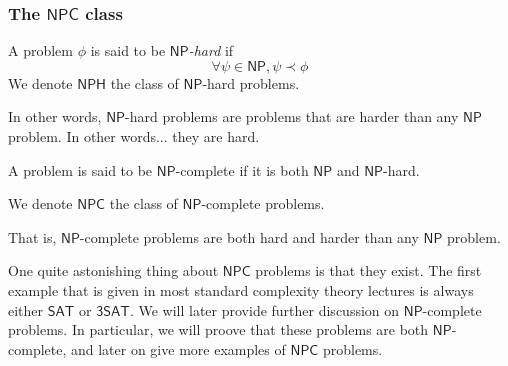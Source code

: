 \subsubsection{The $ \mathsf{NPC} $ class}

\begin{definition}
    A problem $ \phi $ is said to be \textit{$ \mathsf{NP} $-hard} if
    \[
        \forall \psi \in \mathsf{NP}, \psi \prec \phi
    \]
    We denote $ \mathsf{NPH} $ the class of $ \mathsf{NP} $-hard problems.
\end{definition}

In other words, $ \mathsf{NP} $-hard problems are problems that are harder than any $ \mathsf{NP} $ problem. In other words... they are hard.

\begin{definition}
    A problem is said to be $ \mathsf{NP} $-complete if it is both $ \mathsf{NP} $ and $ \mathsf{NP} $-hard.

    We denote $ \mathsf{NPC} $ the class of $ \mathsf{NP} $-complete problems.
\end{definition}

That is, $ \mathsf{NP} $-complete problems are both hard and harder than any $ \mathsf{NP} $ problem. 

One quite astonishing thing about $ \mathsf{NPC} $ problems is that they exist. The first example that is given in most standard complexity theory lectures is always either $ \mathsf{SAT} $ or $ \mathsf{3SAT} $. We will later provide further discussion on $ \mathsf{NP} $-complete problems. In particular, we will proove that these problems are both $ \mathsf{NP} $-complete, and later on give more examples of $ \mathsf{NPC} $ problems.

